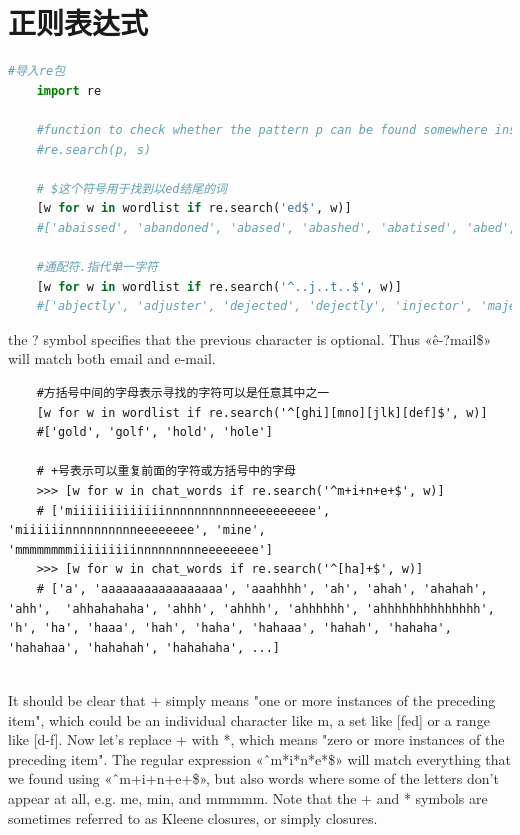 \documentclass{ctexart}
\begin{document}
	
	\section{正则表达式}
	
	\begin{lstlisting}[language=python]
	#导入re包
	import re
	
	#function to check whether the pattern p can be found somewhere inside the string s.
	#re.search(p, s) 
	
	# $这个符号用于找到以ed结尾的词
	[w for w in wordlist if re.search('ed$', w)]
	#['abaissed', 'abandoned', 'abased', 'abashed', 'abatised', 'abed', 'aborted', ...]
	
	#通配符.指代单一字符
	[w for w in wordlist if re.search('^..j..t..$', w)]
	#['abjectly', 'adjuster', 'dejected', 'dejectly', 'injector', 'majestic', ...]
	\end{lstlisting}
	
	the ? symbol specifies that the previous character is optional. Thus «\^e-?mail\$» will match both email and e-mail. 
	
	\begin{lstlisting}
	#方括号中间的字母表示寻找的字符可以是任意其中之一
	[w for w in wordlist if re.search('^[ghi][mno][jlk][def]$', w)]
	#['gold', 'golf', 'hold', 'hole']
	
	# +号表示可以重复前面的字符或方括号中的字母
	>>> [w for w in chat_words if re.search('^m+i+n+e+$', w)]
	# ['miiiiiiiiiiiiinnnnnnnnnnneeeeeeeeee', 'miiiiiinnnnnnnnnneeeeeeee', 'mine',	'mmmmmmmmiiiiiiiiinnnnnnnnneeeeeeee']
	>>> [w for w in chat_words if re.search('^[ha]+$', w)]
	# ['a', 'aaaaaaaaaaaaaaaaa', 'aaahhhh', 'ah', 'ahah', 'ahahah', 'ahh',	'ahhahahaha', 'ahhh', 'ahhhh', 'ahhhhhh', 'ahhhhhhhhhhhhhh', 'h', 'ha', 'haaa',	'hah', 'haha', 'hahaaa', 'hahah', 'hahaha', 'hahahaa', 'hahahah', 'hahahaha', ...]
	
	\end{lstlisting}
	
	It should be clear that + simply means "one or more instances of the preceding item", which could be an individual character like m, a set like [fed] or a range like [d-f]. Now let's replace + with *, which means "zero or more instances of the preceding item". The regular expression «\^\ m*i*n*e*\$» will match everything that we found using «\^\ m+i+n+e+\$», but also words where some of the letters don't appear at all, e.g. me, min, and mmmmm. Note that the + and * symbols are sometimes referred to as Kleene closures, or simply closures.
	
\end{document}
